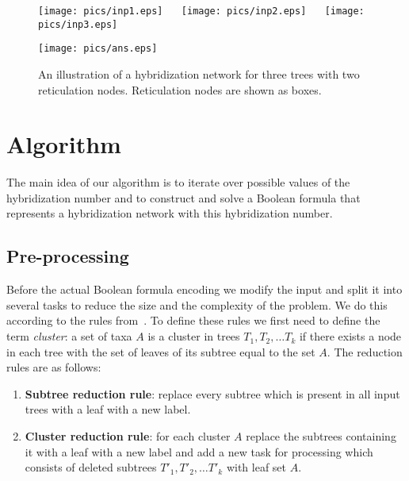\documentclass[runningheads, envcountsame, a4paper]{llncs}
\begin{document}
\begin{figure}[t]
  \centering
  \begin{minipage}[b]{0.59\linewidth}
    \texttt{[image: pics/inp1.eps]}
    ~~
    \texttt{[image: pics/inp2.eps]}
    ~~
    \texttt{[image: pics/inp3.eps]}
  \end{minipage}
  \hfill
  \begin{minipage}[b]{0.40\linewidth}
    \texttt{[image: pics/ans.eps]}
  \end{minipage}
  \caption{An illustration of a hybridization network for three trees with two reticulation nodes. Reticulation nodes are shown as boxes.}
  \label{network-example}
\end{figure}

\section{Algorithm}

The main idea of our algorithm is to iterate over possible values of the hybridization number and to construct and solve a Boolean 
formula that represents a hybridization network with this hybridization number.

\subsection{Pre-processing}

Before the actual Boolean formula encoding we modify the input and split it into several tasks to reduce the size 
and the complexity of the problem. We do this according to the rules from~\cite{bonet2009efficiently}. To define these 
rules we first need to define the term \emph{cluster}: a set of taxa $A$ is a cluster in trees $T_1, T_2, \dots T_k$ if there 
exists a node in each tree with the set of leaves of its subtree equal to the set $A$. The reduction rules are as follows:

\begin{enumerate}

\item \textbf{Subtree reduction rule}:
replace every subtree which is present in all input trees with a leaf with a new label.

\item \textbf{Cluster reduction rule}:
for each cluster $A$ replace the subtrees containing it with a leaf with a new label and add a new task for processing 
which consists of deleted subtrees $T'_1, T'_2, \dots T'_k$ with leaf set $A$.

\end{enumerate}
\end{document}
